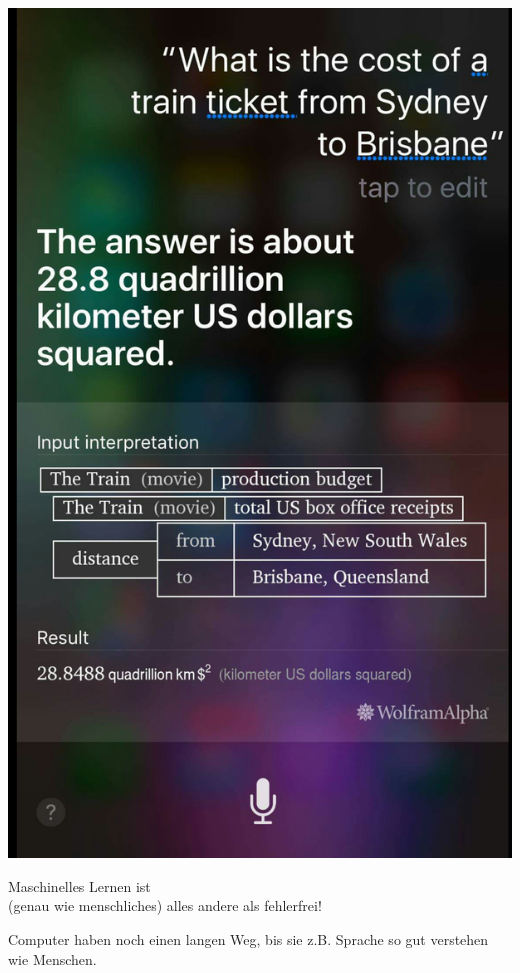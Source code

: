 \documentclass[aspectratio=169,x11names]{beamer}
\begin{document}
\begin{frame}

\begin{multicols}{2}

\includegraphics[scale=0.1]{images/sirifail.jpg} 

\columnbreak

Maschinelles Lernen ist\\(genau wie menschliches) alles andere als fehlerfrei!
\bigskip

Computer haben noch einen langen Weg, bis sie z.B. Sprache so gut verstehen wie Menschen.
\end{multicols}
\end{frame}
\end{document}
